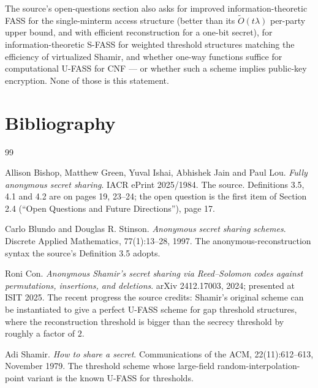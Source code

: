 \documentclass{conjura-conjecture}
\begin{document}
\begin{remark}
The source's open-questions section also asks for improved
information-theoretic FASS for the single-minterm access structure
(better than its $\widetilde{O}(t\lambda)$ per-party upper bound, and
with efficient reconstruction for a one-bit secret), for
information-theoretic S-FASS for weighted threshold structures matching
the efficiency of virtualized Shamir, and whether one-way functions
suffice for computational U-FASS for CNF --- or whether such a scheme
implies public-key encryption. None of those is this statement.
\end{remark}

\section{Bibliography}

\begin{conjurabibliography}{99}

Allison Bishop, Matthew Green, Yuval Ishai, Abhishek Jain and Paul Lou.
\emph{Fully anonymous secret sharing}.
IACR ePrint 2025/1984.
The source. Definitions 3.5, 4.1 and 4.2 are on pages 19, 23--24; the
open question is the first item of Section 2.4 (``Open Questions and
Future Directions''), page 17.

Carlo Blundo and Douglas R. Stinson.
\emph{Anonymous secret sharing schemes}.
Discrete Applied Mathematics, 77(1):13--28, 1997.
The anonymous-reconstruction syntax the source's Definition 3.5 adopts.

Roni Con.
\emph{Anonymous Shamir's secret sharing via Reed--Solomon codes against
permutations, insertions, and deletions}.
arXiv 2412.17003, 2024; presented at ISIT 2025.
The recent progress the source credits: Shamir's original scheme can be
instantiated to give a perfect U-FASS scheme for gap threshold
structures, where the reconstruction threshold is bigger than the secrecy
threshold by roughly a factor of $2$.

Adi Shamir.
\emph{How to share a secret}.
Communications of the ACM, 22(11):612--613, November 1979.
The threshold scheme whose large-field random-interpolation-point variant
is the known U-FASS for thresholds.

\end{conjurabibliography}
\end{document}
